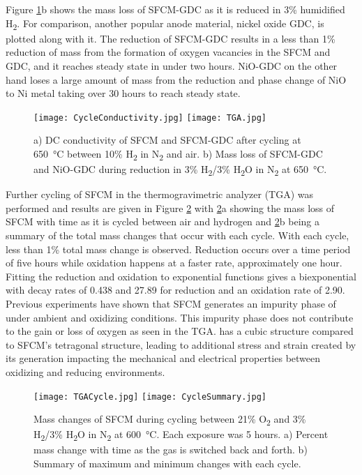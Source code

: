         Figure \ref{fig:TGA}b shows the mass loss of SFCM-GDC as it is reduced in 3\% humidified H\textsubscript{2}.
        For comparison, another popular anode material, nickel oxide GDC, is plotted along with it.
        The reduction of SFCM-GDC results in a less than 1\% reduction of mass from the formation of oxygen vacancies in the SFCM and GDC, and it reaches steady state in under two hours.
        NiO-GDC on the other hand loses a large amount of mass from the reduction and phase change of NiO to Ni metal taking over 30 hours to reach steady state.

        \begin{figure}
          \texttt{[image: CycleConductivity.jpg]}
          \texttt{[image: TGA.jpg]}
          \caption{a) DC conductivity of SFCM and SFCM-GDC after cycling at \SI{650}{\celsius} between 10\% H\textsubscript{2} in N\textsubscript{2} and air. b) Mass loss of SFCM-GDC and NiO-GDC during reduction in 3\% H\textsubscript{2}/3\% H\textsubscript{2}O in N\textsubscript{2} at \SI{650}{\celsius}.}
          \label{fig:TGA}
        \end{figure}

        Further cycling of SFCM in the thermogravimetric analyzer (TGA) was performed and results are given in Figure \ref{fig:Cycled} with \ref{fig:Cycled}a showing the mass loss of SFCM with time as it is cycled between air and hydrogen and \ref{fig:Cycled}b being a summary of the total mass changes that occur with each cycle.
        With each cycle, less than 1\% total mass change is observed.
        Reduction occurs over a time period of five hours while oxidation happens at a faster rate, approximately one hour.
        Fitting the reduction and oxidation to exponential functions gives a biexponential with decay rates of 0.438 and 27.89 for reduction and an oxidation rate of 2.90.
        Previous experiments have shown that SFCM generates an impurity phase of  under ambient and oxidizing conditions.\cite{Stanley2018}
        This impurity phase does not contribute to the gain or loss of oxygen as seen in the TGA.
         has a cubic structure compared to SFCM's tetragonal structure, leading to additional stress and strain created by its generation impacting the mechanical and electrical properties between oxidizing and reducing environments.

        \begin{figure}
          \texttt{[image: TGACycle.jpg]}
          \texttt{[image: CycleSummary.jpg]}
          \caption{Mass changes of SFCM during cycling between 21\% O\textsubscript{2} and 3\% H\textsubscript{2}/3\% H\textsubscript{2}O in N\textsubscript{2} at \SI{600}{\celsius}. Each exposure was 5 hours. a) Percent mass change with time as the gas is switched back and forth. b) Summary of maximum and minimum changes with each cycle.}
          \label{fig:Cycled}
        \end{figure}

